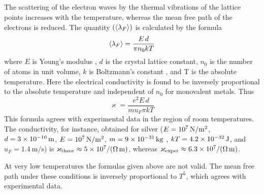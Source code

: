 \subsection{}\label{41.5.5} The scattering of the electron waves by the thermal vibrations of the lattice points increases with the temperature, whereas the mean free path of the electrons is reduced. The quantity $(\expval{\lambda_{F}})$ is calculated by the formula
\begin{equation*}%
\expval{\lambda_{F}} = \frac{E\, d}{\pi n_{0} kT}
\end{equation*}
where $E$ is Young's modulus , $d$ is the crystal lattice constant, $n_{0}$ is the number of atoms in unit volume, $k$ is Boltzmann's constant , and T is the absolute temperature. Here the electrical conductivity is found to be inversely proportional to the absolute temperature and independent of $n_{0}$ for monovalent metals. Thus
\begin{equation*}%
\varkappa =  \frac{e^{2} E\, d}{m u_{F} \pi kT}
\end{equation*}
This formula agrees with experimental data in the region of
room temperatures. The conductivity, for instance, obtained
for silver ($E = \SI{d7}{\newton\per\meter\squared}$, $d = \SI{3d-10}{\meter}$, $E = \SI{d7}{\newton\per\meter\squared}$, $m = \SI{9d-31}{\kilo\gram}$
, $kT = \SI{4.2d-32}{\joule}$, and $u_{F} = \SI{1.4}{\meter\per\second}$) is
 $\varkappa_{\text{theor}} \approx \SI{5d7}{\per\ohm\per\meter}$, whereas  $\varkappa_{\text{exper}} \approx \SI{6.3d7}{\per\ohm\per\meter}$.

At very low temperatures the formulas given above are not valid. The mean free path under these conditions is inversely proportional to $T^{5}$, which agrees with experimental data.

